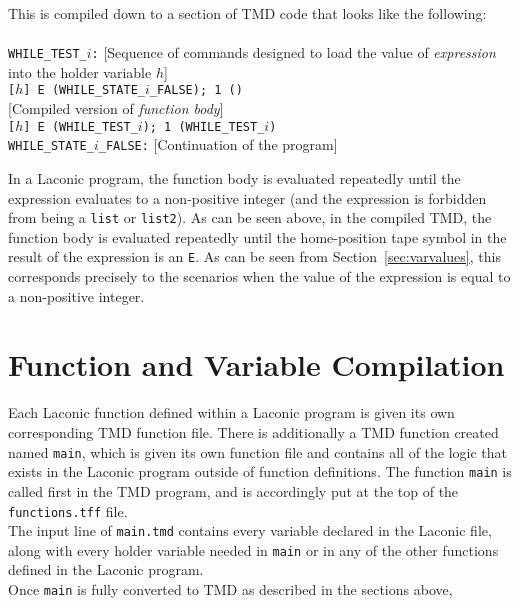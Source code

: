 \documentclass[11pt]{article}
\begin{document}
This is compiled down to a section of TMD code that looks like the following: \\ \\
\texttt{WHILE_TEST_}$i$\texttt{:} [Sequence of commands designed to load the value of \emph{expression} into the holder variable $h$] \\
\texttt{[}$h$\texttt{] E (WHILE_STATE_}$i$\texttt{_FALSE); 1 ()} \\ 
{}[Compiled version of \emph{function body}] \\
\texttt{[}$h$\texttt{] E (WHILE_TEST_}$i$\texttt{); 1 (WHILE_TEST_}$i$\texttt{)} \\
\texttt{WHILE_STATE_}$i$\texttt{_FALSE:} [Continuation of the program] 

In a Laconic program, the function body is evaluated repeatedly until the expression evaluates to a non-positive integer (and the expression is forbidden from being a \texttt{list} or \texttt{list2}). As can be seen above, in the compiled TMD, the function body is evaluated repeatedly until the home-position tape symbol in the result of the expression is an \texttt{E}. As can be seen from Section~\ref{sec:varvalues}, this corresponds precisely to the scenarios when the value of the expression is equal to a non-positive integer.

\section{Function and Variable Compilation} 

Each Laconic function defined within a Laconic program is given its own corresponding TMD function file. There is additionally a TMD function created named \texttt{main}, which is given its own function file and contains all of the logic that exists in the Laconic program outside of function definitions. The function \texttt{main} is called first in the TMD program, and is accordingly put at the top of the \texttt{functions.tff} file. \\

The input line of \texttt{main.tmd} contains every variable declared in the Laconic file, along with every holder variable needed in \texttt{main} or in any of the other functions defined in the Laconic program. \\

Once \texttt{main} is fully converted to TMD as described in the sections above, 
\end{document}
